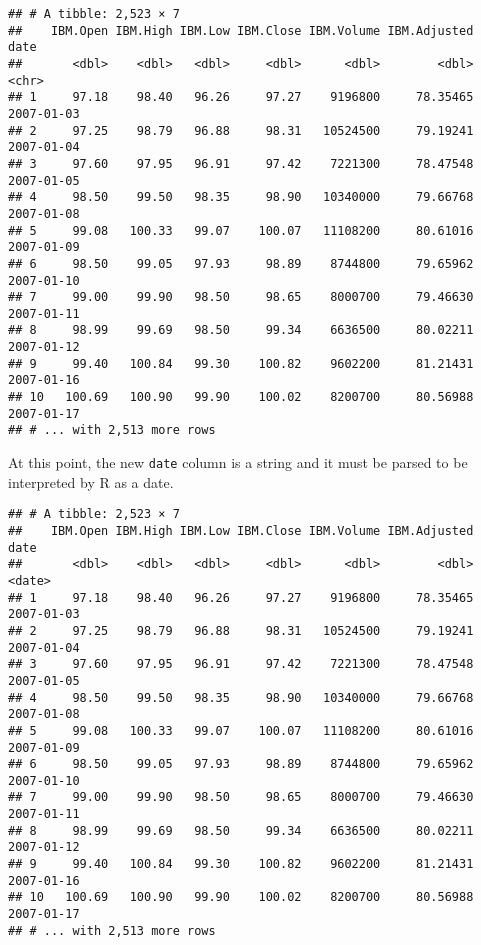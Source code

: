 \documentclass[]{book}
\newenvironment{Shaded}{\begin{snugshade}}{\end{snugshade}}
\newcommand{\KeywordTok}[1]{\textcolor[rgb]{0.13,0.29,0.53}{\textbf{{#1}}}}
\newcommand{\DataTypeTok}[1]{\textcolor[rgb]{0.13,0.29,0.53}{{#1}}}
\newcommand{\StringTok}[1]{\textcolor[rgb]{0.31,0.60,0.02}{{#1}}}
\newcommand{\NormalTok}[1]{{#1}}
\begin{document}
\begin{verbatim}
## # A tibble: 2,523 × 7
##    IBM.Open IBM.High IBM.Low IBM.Close IBM.Volume IBM.Adjusted       date
##       <dbl>    <dbl>   <dbl>     <dbl>      <dbl>        <dbl>      <chr>
## 1     97.18    98.40   96.26     97.27    9196800     78.35465 2007-01-03
## 2     97.25    98.79   96.88     98.31   10524500     79.19241 2007-01-04
## 3     97.60    97.95   96.91     97.42    7221300     78.47548 2007-01-05
## 4     98.50    99.50   98.35     98.90   10340000     79.66768 2007-01-08
## 5     99.08   100.33   99.07    100.07   11108200     80.61016 2007-01-09
## 6     98.50    99.05   97.93     98.89    8744800     79.65962 2007-01-10
## 7     99.00    99.90   98.50     98.65    8000700     79.46630 2007-01-11
## 8     98.99    99.69   98.50     99.34    6636500     80.02211 2007-01-12
## 9     99.40   100.84   99.30    100.82    9602200     81.21431 2007-01-16
## 10   100.69   100.90   99.90    100.02    8200700     80.56988 2007-01-17
## # ... with 2,513 more rows
\end{verbatim}

At this point, the new \texttt{date} column is a string and it must be
parsed to be interpreted by R as a date.

\begin{Shaded}
\end{Shaded}

\begin{verbatim}
## # A tibble: 2,523 × 7
##    IBM.Open IBM.High IBM.Low IBM.Close IBM.Volume IBM.Adjusted       date
##       <dbl>    <dbl>   <dbl>     <dbl>      <dbl>        <dbl>     <date>
## 1     97.18    98.40   96.26     97.27    9196800     78.35465 2007-01-03
## 2     97.25    98.79   96.88     98.31   10524500     79.19241 2007-01-04
## 3     97.60    97.95   96.91     97.42    7221300     78.47548 2007-01-05
## 4     98.50    99.50   98.35     98.90   10340000     79.66768 2007-01-08
## 5     99.08   100.33   99.07    100.07   11108200     80.61016 2007-01-09
## 6     98.50    99.05   97.93     98.89    8744800     79.65962 2007-01-10
## 7     99.00    99.90   98.50     98.65    8000700     79.46630 2007-01-11
## 8     98.99    99.69   98.50     99.34    6636500     80.02211 2007-01-12
## 9     99.40   100.84   99.30    100.82    9602200     81.21431 2007-01-16
## 10   100.69   100.90   99.90    100.02    8200700     80.56988 2007-01-17
## # ... with 2,513 more rows
\end{verbatim}
\end{document}
